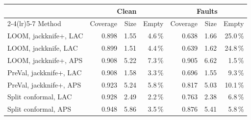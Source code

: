\begin{tabular}{lrrrrrr}
\toprule
& \multicolumn{3}{c}{Clean} & \multicolumn{3}{c}{Faults} \\ \cmidrule(lr){2-4}\cmidrule(lr){5-7}
Method & Coverage & Size & Empty & Coverage & Size & Empty \\
\midrule
LOOM, jackknife+, LAC & 0.898 & 1.55 & 4.6\,\% & 0.638 & 1.66 & 25.0\,\% \\
LOOM, jackknife, LAC & 0.899 & 1.51 & 4.4\,\% & 0.639 & 1.62 & 24.8\,\% \\
LOOM, jackknife+, APS & 0.908 & 5.22 & 7.3\,\% & 0.905 & 6.62 & 1.5\,\% \\
PreVal, jackknife+, LAC & 0.908 & 1.58 & 3.3\,\% & 0.696 & 1.55 & 9.3\,\% \\
PreVal, jackknife+, APS & 0.923 & 5.24 & 5.8\,\% & 0.817 & 5.03 & 10.1\,\% \\
Split conformal, LAC & 0.928 & 2.49 & 2.2\,\% & 0.763 & 2.38 & 6.8\,\% \\
Split conformal, APS & 0.948 & 5.86 & 3.5\,\% & 0.876 & 5.41 & 5.8\,\% \\
\bottomrule
\end{tabular}
